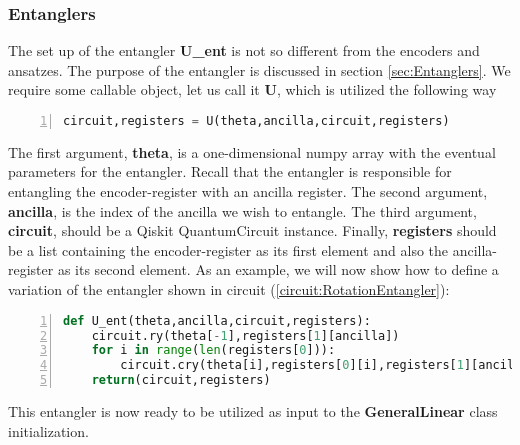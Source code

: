 \subsubsection{Entanglers}
The set up of the entangler \textbf{U\_ent} is not so different from the encoders and ansatzes. The purpose of the entangler is discussed in section \ref{sec:Entanglers}. 
We require some callable object, let us call it \textbf{U}, which is utilized the following way
\begin{lstlisting}[language=Python,numbers=left]
circuit,registers = U(theta,ancilla,circuit,registers)
\end{lstlisting}
The first argument, \textbf{theta}, is a one-dimensional numpy array with the eventual parameters for the entangler. Recall that the entangler is responsible for entangling the encoder-register with an ancilla register. The second argument, \textbf{ancilla}, is the index of the ancilla we wish to entangle.
The third argument, \textbf{circuit}, should be a Qiskit QuantumCircuit instance. Finally, \textbf{registers} should be a list containing the encoder-register as its first element and also the ancilla-register as its second element. As an example, we will now show how to define a variation of the entangler shown in circuit (\ref{circuit:RotationEntangler}):
\begin{lstlisting}[language=Python,numbers=left]
def U_ent(theta,ancilla,circuit,registers):
    circuit.ry(theta[-1],registers[1][ancilla])
    for i in range(len(registers[0])):
        circuit.cry(theta[i],registers[0][i],registers[1][ancilla])
    return(circuit,registers)
\end{lstlisting}
This entangler is now ready to be utilized as input to the \textbf{GeneralLinear} class initialization.

